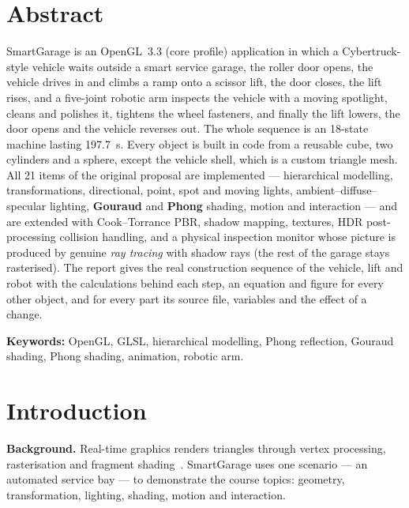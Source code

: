 \documentclass[10pt,a4paper]{article}
\begin{document}
\section*{Abstract}
SmartGarage is an OpenGL~3.3 (core profile) application in which a Cybertruck-style vehicle waits outside a smart
service garage, the roller door opens, the vehicle drives in and climbs a ramp onto a scissor lift, the door closes,
the lift rises, and a five-joint robotic arm inspects the vehicle with a moving spotlight, cleans and polishes it,
tightens the wheel fasteners, and finally the lift lowers, the door opens and the vehicle reverses out. The whole
sequence is an 18-state machine lasting \SI{197.7}{s}. Every object is built in code from a reusable cube, two
cylinders and a sphere, except the vehicle shell, which is a custom triangle mesh. All 21 items of the original
proposal are implemented --- hierarchical modelling, transformations, directional, point, spot and moving
lights, ambient--diffuse--specular lighting, \textbf{Gouraud} and \textbf{Phong} shading, motion and interaction ---
and are extended with Cook--Torrance PBR, shadow mapping, textures, HDR post-processing collision handling, and a physical inspection monitor whose picture is produced by genuine \emph{ray tracing} with shadow rays (the rest of the garage stays rasterised). The
report gives the real construction sequence of the vehicle, lift and robot with the calculations behind each step, an
equation and figure for every other object, and for every part its source file, variables and the effect of a change.

\smallskip\noindent\textbf{Keywords:} OpenGL, GLSL, hierarchical modelling, Phong reflection, Gouraud shading, Phong shading, animation, robotic arm.

\bigskip
\tableofcontents
\clearpage

\section{Introduction}\label{sec:intro}
\textbf{Background.} Real-time graphics renders triangles through vertex processing, rasterisation and fragment
shading~\cite{segal2010opengl,devries2020learnopengl}. SmartGarage uses one scenario --- an automated service bay ---
to demonstrate the course topics: geometry, transformation, lighting, shading, motion and interaction.
\end{document}
